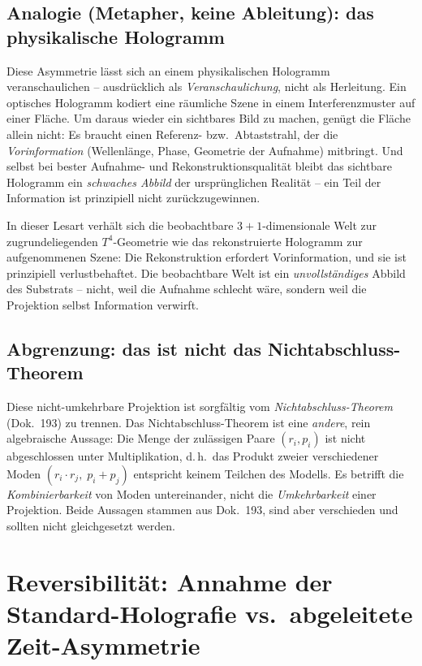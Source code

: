\subsection*{Analogie (Metapher, keine Ableitung): das physikalische Hologramm}

Diese Asymmetrie lässt sich an einem physikalischen Hologramm veranschaulichen
-- ausdrücklich als \emph{Veranschaulichung}, nicht als Herleitung. Ein
optisches Hologramm kodiert eine räumliche Szene in einem Interferenzmuster
auf einer Fläche. Um daraus wieder ein sichtbares Bild zu machen, genügt die
Fläche allein nicht: Es braucht einen Referenz- bzw.\ Abtaststrahl, der die
\emph{Vorinformation} (Wellenlänge, Phase, Geometrie der Aufnahme) mitbringt.
Und selbst bei bester Aufnahme- und Rekonstruktionsqualität bleibt das
sichtbare Hologramm ein \emph{schwaches Abbild} der ursprünglichen Realität --
ein Teil der Information ist prinzipiell nicht zurückzugewinnen.

\medskip

\noindent
In dieser Lesart verhält sich die beobachtbare $3{+}1$-dimensionale Welt zur
zugrundeliegenden $T^4$-Geometrie wie das rekonstruierte Hologramm zur
aufgenommenen Szene: Die Rekonstruktion erfordert Vorinformation, und sie ist
prinzipiell verlustbehaftet. Die beobachtbare Welt ist ein \emph{unvollständiges}
Abbild des Substrats -- nicht, weil die Aufnahme schlecht wäre, sondern weil
die Projektion selbst Information verwirft.

\subsection*{Abgrenzung: das ist nicht das Nichtabschluss-Theorem}

Diese nicht-umkehrbare Projektion ist sorgfältig vom \emph{Nichtabschluss-Theorem}
(Dok.~193) zu trennen. Das Nichtabschluss-Theorem ist eine \emph{andere},
rein algebraische Aussage: Die Menge der zulässigen Paare $(r_i, p_i)$ ist
nicht abgeschlossen unter Multiplikation, d.\,h.\ das Produkt zweier
verschiedener Moden $(r_i\cdot r_j,\; p_i+p_j)$ entspricht keinem Teilchen des
Modells. Es betrifft die \emph{Kombinierbarkeit} von Moden untereinander,
nicht die \emph{Umkehrbarkeit} einer Projektion. Beide Aussagen stammen aus
Dok.~193, sind aber verschieden und sollten nicht gleichgesetzt werden.

\section{Reversibilität: Annahme der Standard-Holografie vs.\ abgeleitete Zeit-Asymmetrie}

